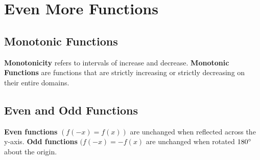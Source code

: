 \section{Even More Functions}

    \subsection{Monotonic Functions}
        \textbf{Monotonicity} refers to intervals of increase and decrease.
        \textbf{Monotonic Functions} are functions that are strictly increasing or strictly
        decreasing on their entire domains. \\

        \begin{center}
        \end{center}



    \subsection{Even and Odd Functions}
        \textbf{Even functions} $(f(-x)=f(x))$ are unchanged when reflected across the y-axis.
        \textbf{Odd functions} $(f(-x)=-f(x)$ are unchanged when rotated $180\degree$ about the origin. \\

